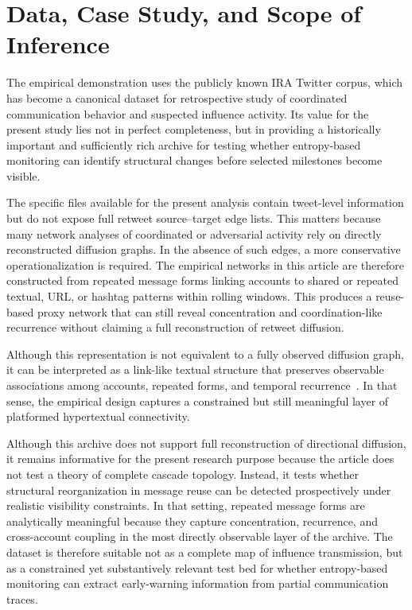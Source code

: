 \documentclass[sigconf]{acmart}
\begin{document}
\section{Data, Case Study, and Scope of Inference}
\label{sec:data}

The empirical demonstration uses the publicly known IRA Twitter corpus, which has become a canonical dataset for retrospective study of coordinated communication behavior and suspected influence activity. Its value for the present study lies not in perfect completeness, but in providing a historically important and sufficiently rich archive for testing whether entropy-based monitoring can identify structural changes before selected milestones become visible.

The specific files available for the present analysis contain tweet-level information but do not expose full retweet source--target edge lists. This matters because many network analyses of coordinated or adversarial activity rely on directly reconstructed diffusion graphs. In the absence of such edges, a more conservative operationalization is required. The empirical networks in this article are therefore constructed from repeated message forms linking accounts to shared or repeated textual, URL, or hashtag patterns within rolling windows. This produces a reuse-based proxy network that can still reveal concentration and coordination-like recurrence without claiming a full reconstruction of retweet diffusion.

Although this representation is not equivalent to a fully observed diffusion graph, it can be interpreted as a link-like textual structure that preserves observable associations among accounts, repeated forms, and temporal recurrence~\cite{Carrino2024,LiadiGraus2023}. In that sense, the empirical design captures a constrained but still meaningful layer of platformed hypertextual connectivity.

Although this archive does not support full reconstruction of directional diffusion, it remains informative for the present research purpose because the article does not test a theory of complete cascade topology. Instead, it tests whether structural reorganization in message reuse can be detected prospectively under realistic visibility constraints. In that setting, repeated message forms are analytically meaningful because they capture concentration, recurrence, and cross-account coupling in the most directly observable layer of the archive. The dataset is therefore suitable not as a complete map of influence transmission, but as a constrained yet substantively relevant test bed for whether entropy-based monitoring can extract early-warning information from partial communication traces.
\end{document}
